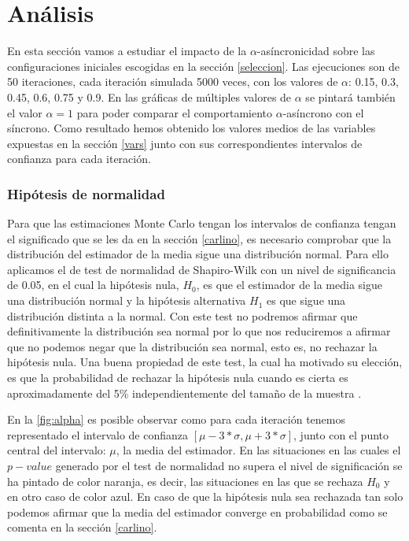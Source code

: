 \documentclass[../proyecto.tex]{memoir}
\begin{document}
\chapter{Análisis}


En esta sección vamos a estudiar el impacto de la $\alpha$-asíncronicidad sobre las configuraciones iniciales escogidas en la sección \ref{seleccion}. Las ejecuciones son de 50 iteraciones, cada iteración simulada 5000 veces, con los valores de $\alpha$: 0.15, 0.3, 0.45, 0.6, 0.75 y 0.9. En las gráficas de múltiples valores de $\alpha$ se pintará también el valor $\alpha=1$ para poder comparar el comportamiento $\alpha$-asíncrono con el síncrono. Como resultado hemos obtenido los valores medios de las variables expuestas en la sección \ref{vars} junto con sus correspondientes intervalos de confianza para cada iteración.

\subsection{Hipótesis de normalidad} \label{normalidad}

Para que las estimaciones Monte Carlo tengan los intervalos de confianza tengan el significado que se les da en la sección \ref{carlino}, es necesario comprobar que la distribución del estimador de la media sigue una distribución normal. Para ello aplicamos el de test de normalidad de Shapiro-Wilk con un nivel de significancia de 0.05, en el cual la hipótesis nula, $H_0$, es que el estimador de la media sigue una distribución normal \cite{shapiro} y la hipótesis alternativa $H_1$ es que sigue una distribución distinta a la normal. Con este test no podremos afirmar que definitivamente la distribución sea normal por lo que nos reduciremos a afirmar que no podemos negar que la distribución sea normal, esto es, no rechazar la hipótesis nula. Una buena propiedad de este test, la cual ha motivado su elección, es que la probabilidad de rechazar la hipótesis nula cuando es cierta es aproximadamente del 5\% independientemente del tamaño de la muestra \cite{powertest}.

En la \autoref{fig:alpha} es posible observar como para cada iteración tenemos representado el intervalo de confianza $[\mu-3*\sigma, \mu+3*\sigma]$, junto con el punto central del intervalo: $\mu$, la media del estimador. En las situaciones en las cuales el $p-value$ generado por el test de normalidad no supera el nivel de significación se ha pintado de color naranja, es decir, las situaciones en las que se rechaza $H_0$ y en otro caso de color azul. En caso de que la hipótesis nula sea rechazada tan solo podemos afirmar que la media del estimador converge en probabilidad como se comenta en la sección \ref{carlino}.
\end{document}
